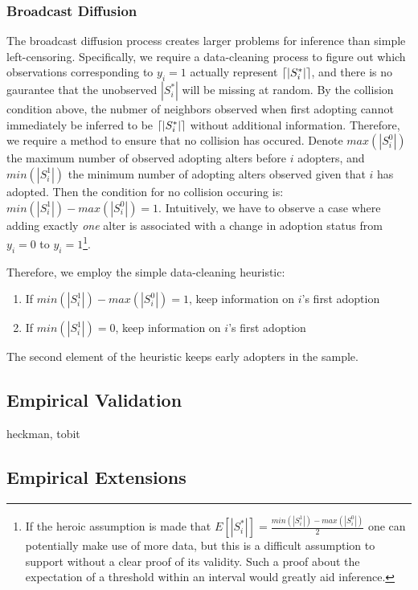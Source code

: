 \documentclass{article}
\DeclarePairedDelimiter{\ceil}{\lceil}{\rceil}
\begin{document}
\subsubsection{Broadcast Diffusion}

The broadcast diffusion process creates larger problems for inference than simple left-censoring. Specifically, we require a data-cleaning process to figure out which observations corresponding to $y_i = 1$ actually represent $\ceil{|S_i^*|}$, and there is no gaurantee that the unobserved $|S_i^*|$ will be missing at random. By the collision condition above, the nubmer of neighbors observed when first adopting cannot immediately be inferred to be $\ceil{|S_i^*|}$ without additional information. Therefore, we require a method to ensure that no collision has occured. Denote $max(|S_i^0|)$ the maximum number of observed adopting alters before $i$ adopters, and $min(|S_i^1|)$ the minimum number of adopting alters observed given that $i$ has adopted. Then the condition for no collision occuring is: $min(|S_i^1|) - max(|S_i^0|) = 1$. Intuitively, we have to observe a case where adding exactly \emph{one} alter is associated with a change in adoption status from $y_i = 0$ to $y_i = 1$\footnote{If the heroic assumption is made that $E[|S_i^*|] = \frac{min(|S_i^1|) - max(|S_i^0|)}{2}$ one can potentially make use of more data, but this is a difficult assumption to support without a clear proof of its validity. Such a proof about the expectation of a threshold within an interval would greatly aid inference.}.

Therefore, we employ the simple data-cleaning heuristic:
\begin{enumerate}
\item If $min(|S_i^1|) - max(|S_i^0|) = 1$, keep information on $i$'s first adoption
\item If $min(|S_i^1|) = 0$, keep information on $i$'s first adoption
\end{enumerate}

The second element of the heuristic keeps early adopters in the sample.



\subsection{Empirical Validation}

heckman, tobit

\subsection{Empirical Extensions}
\end{document}
